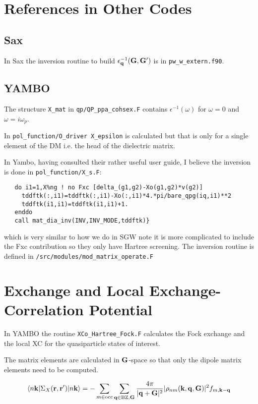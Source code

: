 \documentclass{article}
\def\r{{\bf r}}
\def\k{{\bf k}}
\def\q{{\bf q}}
\def\G{{\bf G}}
\def\bra{\langle}
\def\ket{\rangle}
\begin{document}
\section{References in Other Codes}
\subsection{Sax}
In Sax the inversion routine to build $\epsilon^{-1}_{\q}(\G,\G')$ is in 
\verb;pw_w_extern.f90;.

\subsection{YAMBO}
The structure \verb;X_mat; in \verb;qp/QP_ppa_cohsex.F; 
contains $\epsilon^{-1}(\omega)$ for $\omega=0$ and $\omega=i\omega_{p}$. 

In \verb;pol_function/O_driver X_epsilon; is calculated but that is only for a
single element of the DM i.e. the head of the dielectric matrix.

In Yambo, having consulted their rather useful user guide,
I believe the inversion is done in \verb;pol_function/X_s.F;:
%
\begin{verbatim}
   do i1=1,X%ng ! no Fxc [delta_(g1,g2)-Xo(g1,g2)*v(g2)]
     tddftk(:,i1)=tddftk(:,i1)-Xo(:,i1)*4.*pi/bare_qpg(iq,i1)**2
     tddftk(i1,i1)=tddftk(i1,i1)+1.
   enddo
   call mat_dia_inv(INV,INV_MODE,tddftk)}
\end{verbatim}
%
which is very similar to how we do in SGW note it is more complicated
to include the Fxc contribution so they only have Hartree screening.
The inversion routine is defined in \verb;/src/modules/mod_matrix_operate.F; 

\section{Exchange and Local Exchange-Correlation Potential}
In YAMBO the routine \verb ;XCo_Hartree_Fock.F; calculates 
the Fock exchange and the local XC
for the quasiparticle states of interest.

The matrix elements are calculated in $\G$-space so that only the dipole
matrix elements need to be computed. 

\begin{equation}
\label{eq:yamboex}
\bra n\k|\Sigma_{X}(\r,\r')|n\k\ket=-\sum_{m\in {\rm occ}}\sum_{\q \in {\rm BZ},\G}\frac{4\pi}{|\q+\G|^{2}}|\rho_{nm}(\k,\q,\G)|^{2}f_{m,\k-\q}
\end{equation}
\end{document}
